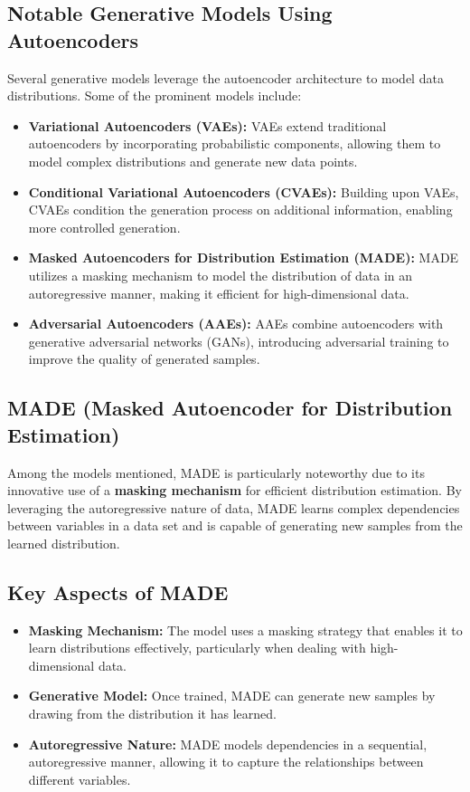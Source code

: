 \documentclass[a4paper,12pt]{article}
\begin{document}
\subsection{Notable Generative Models Using Autoencoders}

Several generative models leverage the autoencoder architecture to model data distributions. Some of the prominent models include:

\begin{itemize}
    \item \textbf{Variational Autoencoders (VAEs):} VAEs extend traditional autoencoders by incorporating probabilistic components, allowing them to model complex distributions and generate new data points.
    \item \textbf{Conditional Variational Autoencoders (CVAEs):} Building upon VAEs, CVAEs condition the generation process on additional information, enabling more controlled generation.
    \item \textbf{Masked Autoencoders for Distribution Estimation (MADE):} MADE utilizes a masking mechanism to model the distribution of data in an autoregressive manner, making it efficient for high-dimensional data.
    \item \textbf{Adversarial Autoencoders (AAEs):} AAEs combine autoencoders with generative adversarial networks (GANs), introducing adversarial training to improve the quality of generated samples.
\end{itemize}

\subsection{MADE (Masked Autoencoder for Distribution Estimation)}

Among the models mentioned, MADE is particularly noteworthy due to its innovative use of a \textbf{masking mechanism} for efficient distribution estimation. By leveraging the autoregressive nature of data, MADE learns complex dependencies between variables in a data set and is capable of generating new samples from the learned distribution.

\subsection{Key Aspects of MADE}

\begin{itemize}
    \item \textbf{Masking Mechanism:} The model uses a masking strategy that enables it to learn distributions effectively, particularly when dealing with high-dimensional data.
    \item \textbf{Generative Model:} Once trained, MADE can generate new samples by drawing from the distribution it has learned.
    \item \textbf{Autoregressive Nature:} MADE models dependencies in a sequential, autoregressive manner, allowing it to capture the relationships between different variables.
\end{itemize}
\end{document}
